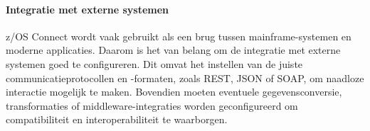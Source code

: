\paragraph{Integratie met externe systemen}
z/OS Connect wordt vaak gebruikt als een brug tussen mainframe-systemen en moderne applicaties. Daarom is het van belang om de integratie met externe systemen goed te configureren. Dit omvat het instellen van de juiste communicatieprotocollen en -formaten, zoals REST, JSON of SOAP, om naadloze interactie mogelijk te maken. Bovendien moeten eventuele gegevensconversie, transformaties of middleware-integraties worden geconfigureerd om compatibiliteit en interoperabiliteit te waarborgen. \autocite{IBM2023c}
\\ \\